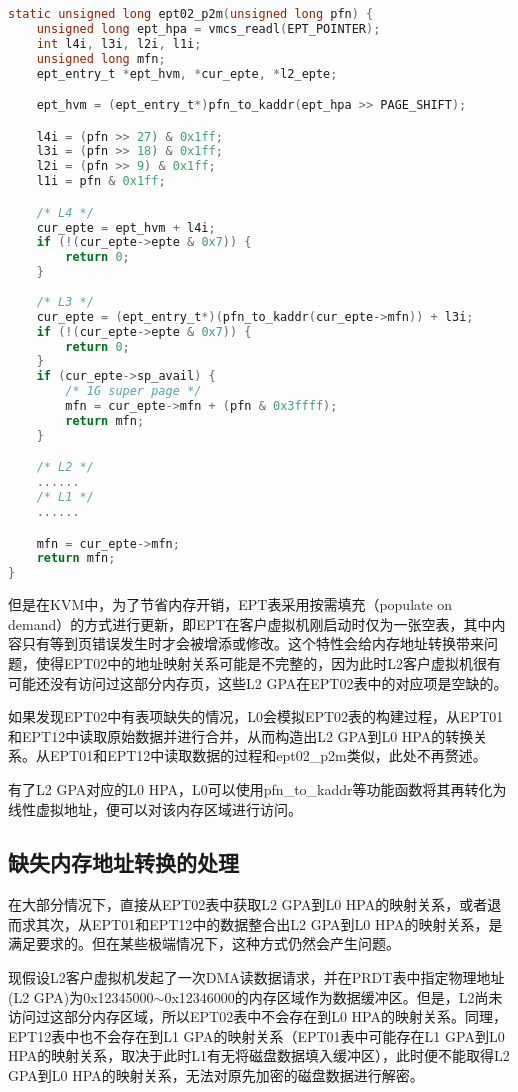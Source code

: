 \begin{lstlisting}[language={C}, caption={ept02\_p2m实现源代码}]
static unsigned long ept02_p2m(unsigned long pfn) {
    unsigned long ept_hpa = vmcs_readl(EPT_POINTER);
    int l4i, l3i, l2i, l1i;
    unsigned long mfn;
    ept_entry_t *ept_hvm, *cur_epte, *l2_epte;

    ept_hvm = (ept_entry_t*)pfn_to_kaddr(ept_hpa >> PAGE_SHIFT);

    l4i = (pfn >> 27) & 0x1ff;
    l3i = (pfn >> 18) & 0x1ff;
    l2i = (pfn >> 9) & 0x1ff;
    l1i = pfn & 0x1ff;

    /* L4 */
    cur_epte = ept_hvm + l4i;
    if (!(cur_epte->epte & 0x7)) {
        return 0;
    }
    
    /* L3 */
    cur_epte = (ept_entry_t*)(pfn_to_kaddr(cur_epte->mfn)) + l3i;
    if (!(cur_epte->epte & 0x7)) {
        return 0;
    }
    if (cur_epte->sp_avail) {
    	/* 1G super page */
        mfn = cur_epte->mfn + (pfn & 0x3ffff);
        return mfn;
    }

    /* L2 */
    ......
    /* L1 */
    ......

    mfn = cur_epte->mfn;
    return mfn;
}
\end{lstlisting}

但是在KVM中，为了节省内存开销，EPT表采用按需填充（populate on demand）的方式进行更新，即EPT在客户虚拟机刚启动时仅为一张空表，其中内容只有等到页错误发生时才会被增添或修改。这个特性会给内存地址转换带来问题，使得EPT02中的地址映射关系可能是不完整的，因为此时L2客户虚拟机很有可能还没有访问过这部分内存页，这些L2 GPA在EPT02表中的对应项是空缺的。

如果发现EPT02中有表项缺失的情况，L0会模拟EPT02表的构建过程，从EPT01和EPT12中读取原始数据并进行合并，从而构造出L2 GPA到L0 HPA的转换关系。从EPT01和EPT12中读取数据的过程和ept02\_p2m类似，此处不再赘述。

有了L2 GPA对应的L0 HPA，L0可以使用pfn\_to\_kaddr等功能函数将其再转化为线性虚拟地址，便可以对该内存区域进行访问。

\subsection{缺失内存地址转换的处理}

在大部分情况下，直接从EPT02表中获取L2 GPA到L0 HPA的映射关系，或者退而求其次，从EPT01和EPT12中的数据整合出L2 GPA到L0 HPA的映射关系，是满足要求的。但在某些极端情况下，这种方式仍然会产生问题。

现假设L2客户虚拟机发起了一次DMA读数据请求，并在PRDT表中指定物理地址(L2 GPA)为0x12345000$\sim$0x12346000的内存区域作为数据缓冲区。但是，L2尚未访问过这部分内存区域，所以EPT02表中不会存在到L0 HPA的映射关系。同理，EPT12表中也不会存在到L1 GPA的映射关系（EPT01表中可能存在L1 GPA到L0 HPA的映射关系，取决于此时L1有无将磁盘数据填入缓冲区），此时便不能取得L2 GPA到L0 HPA的映射关系，无法对原先加密的磁盘数据进行解密。

